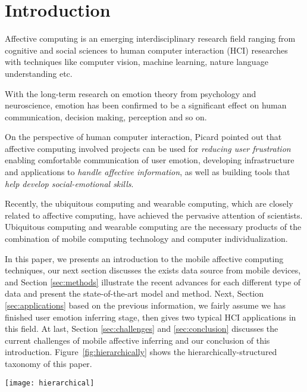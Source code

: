\section{Introduction}\label{sec:intro}

Affective computing is an emerging interdisciplinary research field ranging from cognitive and social sciences to human computer interaction (HCI) researches with techniques like computer vision, machine learning, nature language understanding etc.

With the long-term research on emotion theory from psychology and neuroscience\cite{james1884emotion, turkle2005second}, emotion has been confirmed to be a significant effect \cite{james2013emotion} on human communication, decision making, perception and so on.

On the perspective of human computer interaction, Picard \cite{picard1999affective} pointed out that affective computing involved projects can be used for \emph{reducing user frustration} enabling comfortable communication of user emotion, developing infrastructure and applications to \emph{handle affective information}, as well as building tools that \emph{help develop social-emotional skills}.

Recently, the ubiquitous computing\cite{weiser1991computer} and wearable computing\cite{starner1996human}, which are closely related to affective computing, have achieved the pervasive attention of scientists. Ubiquitous computing and wearable computing are the necessary products of the combination of mobile computing technology and computer individualization.

In this paper, we presents an introduction to the mobile affective computing techniques, our next section discusses the exists data source from mobile devices, and Section \ref{sec:methods} illustrate the recent advances for each different type of data and present the state-of-the-art model and method. Next, Section \ref{sec:applications} based on the previous information, we fairly assume we has finished user emotion inferring stage, then gives two typical HCI applications in this field. At last, Section \ref{sec:challenges} and \ref{sec:conclusion} discusses the current challenges of mobile affective inferring and our conclusion of this introduction.
Figure~\ref{fig:hierarchically} shows the hierarchically-structured taxonomy of this paper.

\begin{figure*}[htb]
    \centering
    \texttt{[image: hierarchical]}
    \caption{Hierarchically-structured taxonomy of this paper.}
    \label{fig:hierarchically}
\end{figure*}